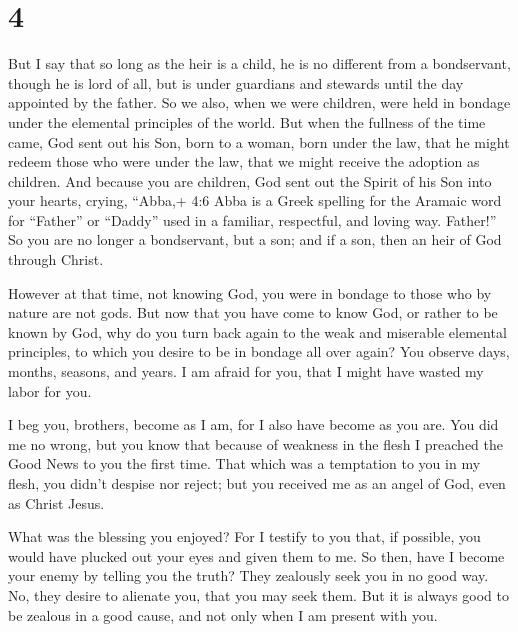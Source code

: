 \hypertarget{section-3}{%
\section{4}\label{section-3}}

 But I say that so long as the heir is a child, he is no
different from a bondservant, though he is lord of all,  but
is under guardians and stewards until the day appointed by the father.
 So we also, when we were children, were held in bondage
under the elemental principles of the world.  But when the
fullness of the time came, God sent out his Son, born to a woman, born
under the law,  that he might redeem those who were under
the law, that we might receive the adoption as children. 
And because you are children, God sent out the Spirit of his Son into
your hearts, crying, ``Abba,+ 4:6 Abba is a Greek spelling for the
Aramaic word for ``Father'' or ``Daddy'' used in a familiar, respectful,
and loving way. Father!''  So you are no longer a
bondservant, but a son; and if a son, then an heir of God through
Christ.

 However at that time, not knowing God, you were in bondage
to those who by nature are not gods.  But now that you have
come to know God, or rather to be known by God, why do you turn back
again to the weak and miserable elemental principles, to which you
desire to be in bondage all over again?  You observe days,
months, seasons, and years.  I am afraid for you, that I
might have wasted my labor for you.

 I beg you, brothers, become as I am, for I also have
become as you are. You did me no wrong,  but you know that
because of weakness in the flesh I preached the Good News to you the
first time.  That which was a temptation to you in my
flesh, you didn't despise nor reject; but you received me as an angel of
God, even as Christ Jesus.

 What was the blessing you enjoyed? For I testify to you
that, if possible, you would have plucked out your eyes and given them
to me.  So then, have I become your enemy by telling you
the truth?  They zealously seek you in no good way. No,
they desire to alienate you, that you may seek them.  But
it is always good to be zealous in a good cause, and not only when I am
present with you.

